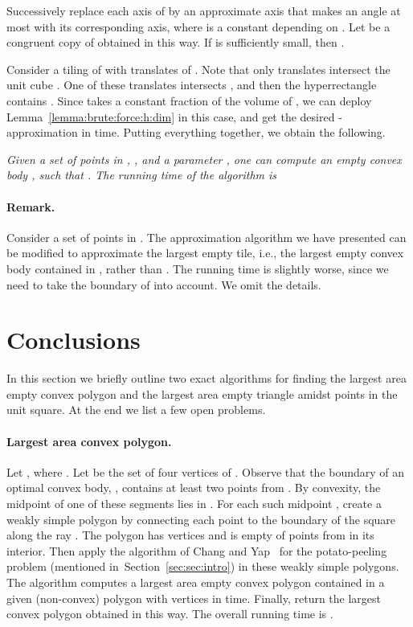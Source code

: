 \documentclass[11pt]{article}
\def\ie{{i.e.}}
\newcommand{\lemref}[1]{Lemma~\ref{lemma:#1}}
\newcommand{\seclab}[1]{\label{sec:#1}}
\newcommand{\secref}[1]{Section~\ref{sec:#1}}
\newcommand{\thmref}[1]{Theorem~\ref{theo:#1}}
\begin{document}
Successively replace each axis of  by an approximate axis
that makes an angle at most  with its
corresponding axis, where  is a constant depending on .
Let  be a congruent copy of  obtained in this way.
If  is sufficiently small, then .

Consider a tiling of  with translates of . Note that
only  translates intersect the unit cube
. One of these translates  intersects ,
and then the hyperrectangle  contains .
Since  takes a constant fraction of the volume of ,
we can deploy \lemref{brute:force:h:dim} in this case, and get the desired
-approximation in
 time.
Putting everything together, we obtain the following.

\medskip \noindent {\bf \thmref{empty}} {\em
    Given a set  of  points in , , and
    a parameter , one can compute an empty convex body
    , such that . The running time of the algorithm is
   
}

\paragraph{Remark.}  Consider a set  of  points in
.  The approximation algorithm we have presented can be
modified to approximate the largest empty tile, \ie, the largest empty
convex body contained in , rather than .  The
running time is slightly worse, since we need to take the boundary of
 into account. We omit the details.


\section{Conclusions} \seclab{sec:conclusion}

In this section we briefly outline two exact algorithms for finding
the largest area empty convex polygon and the largest area empty
triangle amidst  points in the unit square. At the end we list a
few open problems.


\paragraph{Largest area convex polygon.}
Let , where . Let  be the set of
four vertices of . Observe that the boundary of an optimal convex
body, , contains at least two points from .
By convexity, the midpoint of one of these  segments
lies in . For each such midpoint ,
create a weakly simple polygon  by connecting each
point  to the boundary of the square along the
ray . The polygon  has  vertices and is empty of points
from  in its interior. Then apply the algorithm of Chang and
Yap~\cite{CY86} for the potato-peeling problem (mentioned
in~\secref{sec:intro}) in these  weakly simple
polygons. The algorithm computes a largest area empty convex
polygon contained in a given (non-convex) polygon with  vertices in
 time. Finally, return the largest convex polygon obtained
in this way. The overall running time is .
\end{document}

